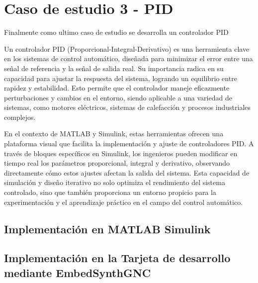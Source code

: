 \section{Caso de estudio 3 - PID}

Finalmente como ultimo caso de estudio se desarrolla un controlador PID 

Un controlador PID (Proporcional-Integral-Derivativo) es una herramienta clave en los sistemas de control automático, diseñada para minimizar el error entre una señal de referencia y la señal de salida real. Su importancia radica en su capacidad para ajustar la respuesta del sistema, logrando un equilibrio entre rapidez y estabilidad. Esto permite que el controlador maneje eficazmente perturbaciones y cambios en el entorno, siendo aplicable a una variedad de sistemas, como motores eléctricos, sistemas de calefacción y procesos industriales complejos.

En el contexto de MATLAB y Simulink, estas herramientas ofrecen una plataforma visual que facilita la implementación y ajuste de controladores PID. A través de bloques específicos en Simulink, los ingenieros pueden modificar en tiempo real los parámetros proporcional, integral y derivativo, observando directamente cómo estos ajustes afectan la salida del sistema. Esta capacidad de simulación y diseño iterativo no solo optimiza el rendimiento del sistema controlado, sino que también proporciona un entorno propicio para la experimentación y el aprendizaje práctico en el campo del control automático.


\subsection{Implementación en MATLAB Simulink}

\subsection{Implementación en la Tarjeta de desarrollo mediante EmbedSynthGNC}